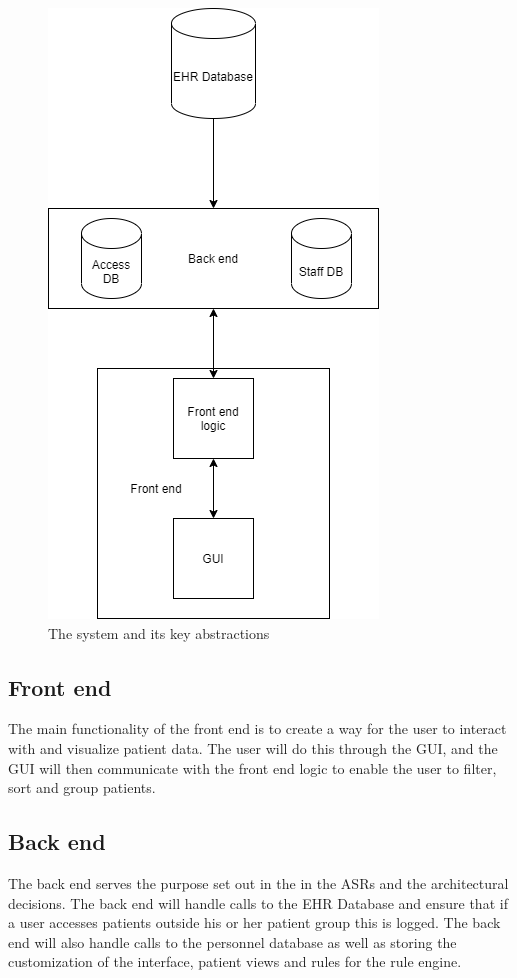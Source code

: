 \documentclass{article}
\begin{document}
\begin{figure}[h]
    \centering
    \includegraphics[scale = 0.5]{key-abstraction}
    \caption{The system and its key abstractions}
    \label{fig:key-abstractions}
\end{figure}


\subsection{Front end}
The main functionality of the front end is to create a way for the user to interact with and visualize patient data. The user will do this through the GUI, and the GUI will then communicate with the front end logic to enable the user to filter, sort and group patients. 

\subsection{Back end}
The back end serves the purpose set out in the in the ASRs and the architectural decisions. The back end will handle calls to the EHR Database and ensure that if a user accesses patients outside his or her patient group this is logged. The back end will also handle calls to the personnel database as well as storing the customization of the interface, patient views and rules for the rule engine.
\end{document}
